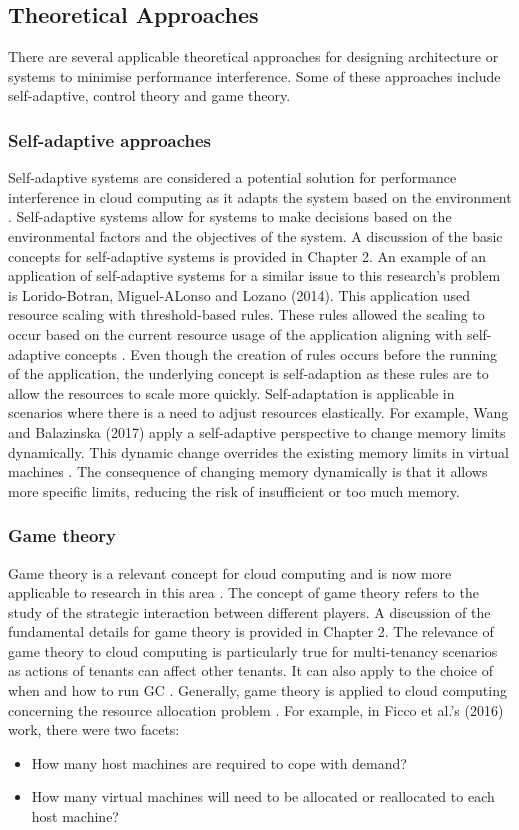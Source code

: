 \subsection{Theoretical Approaches}
There are several applicable theoretical approaches for designing
architecture or systems to minimise performance interference. Some of
these approaches include self-adaptive, control theory and game theory.
\subsubsection{Self-adaptive approaches}
Self-adaptive systems are considered a potential solution for
performance interference in cloud computing as it adapts the system
based on the environment \cite{macias2013selfadapt}. Self-adaptive systems allow for systems to make decisions based
on the environmental factors and the objectives of the system. A
discussion of the basic concepts for self-adaptive systems is provided
in Chapter 2. An example of an application of self-adaptive systems for
a similar issue to this research's problem is Lorido-Botran,
Miguel-ALonso and Lozano (2014). This application used resource scaling
with threshold-based rules. These rules allowed the scaling to occur
based on the current resource usage of the application aligning with
self-adaptive concepts \cite{lorido2014review}.
Even though the creation of rules occurs before the running of the
application, the underlying concept is self-adaption as these rules are
to allow the resources to scale more quickly.
\newline\newline
Self-adaptation is applicable in scenarios where there is a need to adjust resources elastically. For example, Wang and Balazinska (2017) apply a self-adaptive perspective to change memory limits dynamically. This dynamic change overrides the existing memory limits in virtual machines \cite{wang2017elastic}. The consequence of changing memory dynamically is that it allows more specific limits, reducing the risk of insufficient or too much memory.
\subsubsection{Game theory}
Game theory is a relevant concept for cloud computing and is now more applicable to research in this area \cite{zheng2018dynamic}. The
concept of game theory refers to the study of the strategic interaction between different players. A discussion of the fundamental details for game theory is provided in Chapter 2. The relevance of game theory to cloud computing is particularly true for multi-tenancy scenarios as actions of tenants can affect other tenants. It can also apply to the
choice of when and how to run GC \cite{maas2015trash}. Generally, game theory is applied to cloud computing
concerning the resource allocation problem \cite{ficco2016coral}.  For example, in Ficco et al.'s (2016) work,
there were two facets:
\begin{itemize}
    \item How many host machines are required to cope with demand?
    \item How many virtual machines will need to be allocated or reallocated to each host machine?
\end{itemize}

